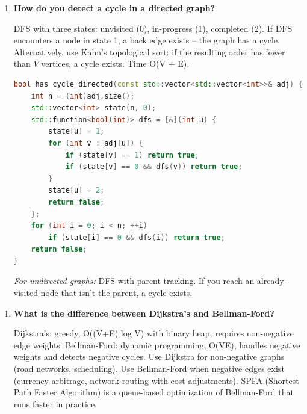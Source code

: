 \begin{enumerate}
\item \textbf{How do you detect a cycle in a directed graph?}

DFS with three states: unvisited (0), in-progress (1), completed (2). If DFS encounters a node in state 1, a back edge exists -- the graph has a cycle. Alternatively, use Kahn's topological sort: if the resulting order has fewer than $V$ vertices, a cycle exists. Time O(V + E).

\begin{lstlisting}[language=C++]
bool has_cycle_directed(const std::vector<std::vector<int>>& adj) {
    int n = (int)adj.size();
    std::vector<int> state(n, 0);
    std::function<bool(int)> dfs = [&](int u) {
        state[u] = 1;
        for (int v : adj[u]) {
            if (state[v] == 1) return true;
            if (state[v] == 0 && dfs(v)) return true;
        }
        state[u] = 2;
        return false;
    };
    for (int i = 0; i < n; ++i)
        if (state[i] == 0 && dfs(i)) return true;
    return false;
}
\end{lstlisting}

\textit{For undirected graphs:} DFS with parent tracking. If you reach an already-visited node that isn't the parent, a cycle exists.
\end{enumerate}

\begin{enumerate}
\item \textbf{What is the difference between Dijkstra's and Bellman-Ford?}

Dijkstra's: greedy, O((V+E) log V) with binary heap, requires non-negative edge weights. Bellman-Ford: dynamic programming, O(VE), handles negative weights and detects negative cycles. Use Dijkstra for non-negative graphs (road networks, scheduling). Use Bellman-Ford when negative edges exist (currency arbitrage, network routing with cost adjustments). SPFA (Shortest Path Faster Algorithm) is a queue-based optimization of Bellman-Ford that runs faster in practice.
\end{enumerate}

